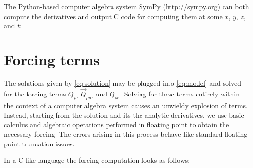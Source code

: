 \documentclass[10pt,reqno]{amsart}
\begin{document}
The Python-based computer algebra system SymPy (\url{http://sympy.org})
can both compute the derivatives and output C code for computing them
at some $x$, $y$, $z$, and $t$:


\section{Forcing terms}

The solutions given by \eqref{eq:solution} may be plugged into \eqref{eq:model}
and solved for the forcing terms $Q_{\rho}$, $\vec{Q}_{\rho{}u}$, and
$Q_{\rho{}e}$.  Solving for these terms entirely within the context of a
computer algebra system causes an unwieldy explosion of terms.  Instead,
starting from the solution and its the analytic derivatives, we use basic
calculus and algebraic operations performed in floating point to obtain the
necessary forcing.  The errors arising in this process behave like standard
floating point truncation issues.

In a C-like language the forcing computation looks as follows:

\end{document}
